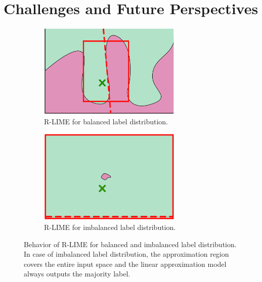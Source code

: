 \documentclass[11pt]{article}
\begin{document}
\section{Challenges and Future Perspectives}
 {%
  \def\imgwidth{0.47\textwidth}
  \begin{figure}[t]
	  \centering
	  \begin{subfigure}[t]{\imgwidth}
		  \centering
		  \includegraphics[width=0.75\textwidth]{visual-rlime3}
		  \caption{R-LIME for balanced label distribution.}\label{fig:balanced}
	  \end{subfigure}
	  \begin{subfigure}[t]{\imgwidth}
		  \centering
		  \includegraphics[width=0.75\textwidth]{visual-rlime-imbalanced}
		  \caption{R-LIME for imbalanced label distribution.
		  }\label{fig:imbalanced}
	  \end{subfigure}
	  \caption[Behavior of R-LIME for balanced and imbalanced label distribution]{%
		  Behavior of R-LIME for balanced and imbalanced label distribution.
		  In case of imbalanced label distribution,
		  the approximation region covers the entire input space and the
		  linear approximation model always outputs the majority label.
	  }
  \end{figure}
 }
\end{document}
